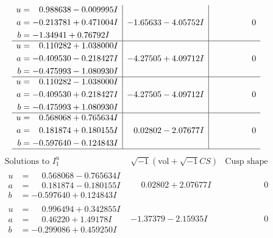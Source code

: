 \documentclass[1p]{elsarticle_modified}
\theoremstyle{definition}
\newcommand{\I}{\sqrt{-1}}
\begin{document}
$$\begin{array}{c|c|c}
\begin{aligned}
u &= \phantom{-}0.988638 - 0.009995 I \\
a &= -0.213781 + 0.471004 I \\
b &= -1.34941 + 0.76792 I\end{aligned}
 & -1.65633 - 4.05752 I & \phantom{-0.000000 } 0 \\ \hline\begin{aligned}
u &= \phantom{-}0.110282 + 1.038000 I \\
a &= -0.409530 - 0.218427 I \\
b &= -0.475993 - 1.080930 I\end{aligned}
 & -4.27505 + 4.09712 I & \phantom{-0.000000 } 0 \\ \hline\begin{aligned}
u &= \phantom{-}0.110282 - 1.038000 I \\
a &= -0.409530 + 0.218427 I \\
b &= -0.475993 + 1.080930 I\end{aligned}
 & -4.27505 - 4.09712 I & \phantom{-0.000000 } 0 \\ \hline\begin{aligned}
u &= \phantom{-}0.568068 + 0.765634 I \\
a &= \phantom{-}0.181874 + 0.180155 I \\
b &= -0.597640 - 0.124843 I\end{aligned}
 & \phantom{-}0.02802 - 2.07677 I & \phantom{-0.000000 } 0\\
 \hline 
 \end{array}$$\newpage$$\begin{array}{c|c|c}  
\text{Solutions to }I^u_{1}& \I (\text{vol} + \sqrt{-1}CS) & \text{Cusp shape}\\
 \hline 
\begin{aligned}
u &= \phantom{-}0.568068 - 0.765634 I \\
a &= \phantom{-}0.181874 - 0.180155 I \\
b &= -0.597640 + 0.124843 I\end{aligned}
 & \phantom{-}0.02802 + 2.07677 I & \phantom{-0.000000 } 0 \\ \hline\begin{aligned}
u &= \phantom{-}0.996494 + 0.342855 I \\
a &= \phantom{-}0.46220 + 1.49178 I \\
b &= -0.299086 + 0.459250 I\end{aligned}
 & -1.37379 - 2.15935 I & \phantom{-0.000000 } 0 \\ \hline\begin{aligned}

\end{aligned}
\end{array}$$
\end{document}

